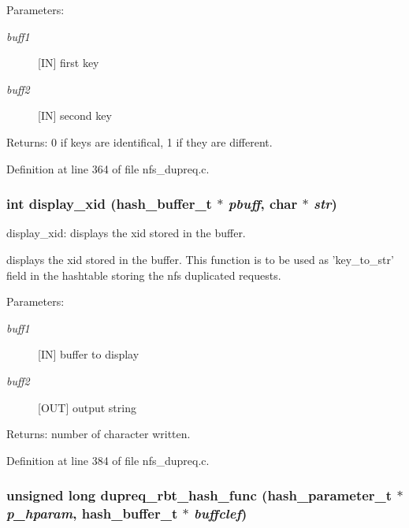 \begin{Desc}
\item[Parameters:]
\begin{description}
\item[{\em buff1}][IN] first key \item[{\em buff2}][IN] second key\end{description}
\end{Desc}
\begin{Desc}
\item[Returns:]0 if keys are identifical, 1 if they are different. \end{Desc}


Definition at line 364 of file nfs\_\-dupreq.c.
\subsubsection[{display\_\-xid}]{\setlength{\rightskip}{0pt plus 5cm}int display\_\-xid (hash\_\-buffer\_\-t $\ast$ {\em pbuff}, \/  char $\ast$ {\em str})}\label{nfs__dupreq_8c_30afd5b6d3dff5d4d7d4767089d59b44}


display\_\-xid: displays the xid stored in the buffer.

displays the xid stored in the buffer. This function is to be used as 'key\_\-to\_\-str' field in the hashtable storing the nfs duplicated requests.

\begin{Desc}
\item[Parameters:]
\begin{description}
\item[{\em buff1}][IN] buffer to display \item[{\em buff2}][OUT] output string\end{description}
\end{Desc}
\begin{Desc}
\item[Returns:]number of character written. \end{Desc}


Definition at line 384 of file nfs\_\-dupreq.c.
\subsubsection[{dupreq\_\-rbt\_\-hash\_\-func}]{\setlength{\rightskip}{0pt plus 5cm}unsigned long dupreq\_\-rbt\_\-hash\_\-func (hash\_\-parameter\_\-t $\ast$ {\em p\_\-hparam}, \/  hash\_\-buffer\_\-t $\ast$ {\em buffclef})}\label{nfs__dupreq_8c_cd77080a96d71b76efbdee9178171504}


